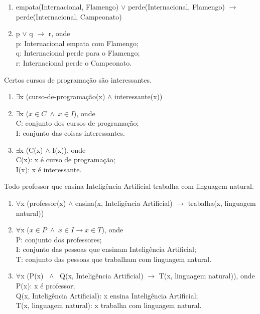 \begin{enumerate}[label=(\roman*)]
    \item empata(Internacional, Flamengo) $\vee$ perde(Internacional, Flamengo) $\to$ perde(Internacional, Campeonato)
    \item p $\vee$ q $\to$ r, onde\\
    p: Internacional empata com Flamengo;\\
    q: Internacional perde para o Flamengo;\\
    r: Internacional perde o Campeonato.
\end{enumerate}

\bigskip
\begin{exemplo} Certos cursos de programação são interessantes.
\end{exemplo}

\begin{enumerate}[label=(\roman*)]
    \item $\exists$x (curso-de-programação(x) $\wedge$ interessante(x))
    \item $\exists$x ($x \in C \; \wedge \; x \in I$), onde\\
    C: conjunto dos cursos de programação;\\
    I: conjunto das coisas interessantes.
    \item $\exists$x (C(x) $\wedge$ I(x)), onde\\
    C(x): x é curso de programação;\\
    I(x): x é interessante.
\end{enumerate}

\bigskip
\begin{exemplo} Todo professor que ensina Inteligência Artificial trabalha com linguagem natural.
\end{exemplo}

\begin{enumerate}[label=(\roman*)]
    \item $\forall$x (professor(x) $\wedge$ ensina(x, Inteligência Artificial) $\to$ trabalha(x, linguagem natural))
    \item $\forall$x ($x \in P \; \wedge \; x \in I \to x \in T$), onde\\
    P: conjunto dos professores;\\
    I: conjunto das pessoas que ensinam Inteligência Artificial;\\
    T: conjunto das pessoas que trabalham com linguagem natural.
    \item $\forall$x (P(x) $\; \wedge \;$ Q(x, Inteligência Artificial) $\to$ T(x, linguagem natural)), onde\\
    P(x): x é professor;\\
    Q(x, Inteligência Artificial): x ensina Inteligência Artificial;\\
    T(x, linguagem natural): x trabalha com linguagem natural.
\end{enumerate}

